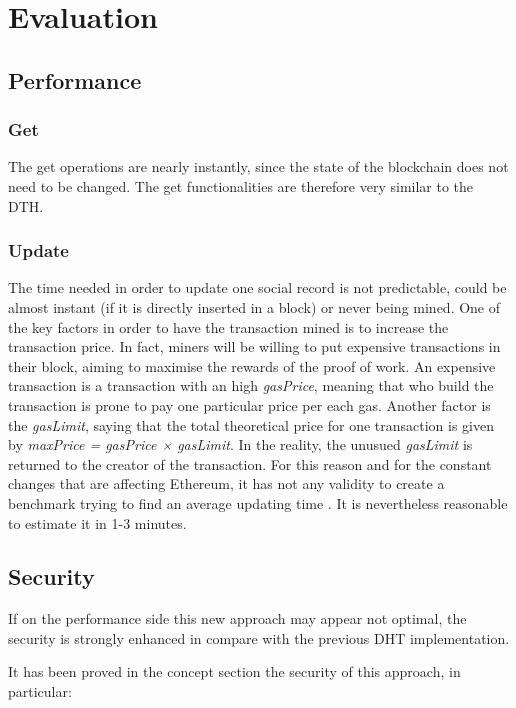 \chapter{Evaluation}
\label{evaluation}

\section{Performance}

\subsection{Get}
The get operations are nearly instantly, since the state of the blockchain does not need to be changed.
The get functionalities are therefore very similar to the DTH.

\subsection{Update}
The time needed in order to update one social record is not predictable, could be almost instant (if it is directly inserted in a block) or never being mined.
One of the key factors in order to have the transaction mined is to increase the transaction price.
In fact, miners will be willing to put expensive transactions in their block, aiming to maximise the rewards of the proof of work.
An expensive transaction is a transaction with an high \textit{gasPrice}, meaning that who build the transaction is prone to pay one particular price per each gas.
Another factor is the \textit{gasLimit}, saying that the total theoretical price for one transaction is given by \textit{maxPrice = gasPrice × gasLimit}.
In the reality, the unusued \textit{gasLimit} is returned to the creator of the transaction.
For this reason and for the constant changes that are affecting Ethereum, it has not any validity to create a benchmark trying to find an average updating time \cite{miningTime}.
It is nevertheless reasonable to estimate it in 1-3 minutes.

\section{Security}

If on the performance side this new approach may appear not optimal, the security is strongly enhanced in compare with the previous DHT implementation.

It has been proved in the concept section the security of this approach, in particular:

